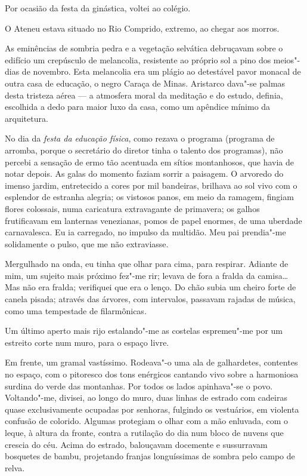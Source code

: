 Por ocasião da festa da ginástica, voltei ao colégio. 

O Ateneu estava situado no Rio Comprido, extremo, ao chegar aos morros.

As eminências de sombria pedra e a vegetação selvática debruçavam sobre
o edifício um crepúsculo de melancolia, resistente ao próprio sol a
pino dos meios"-dias de novembro. Esta melancolia era um plágio ao
detestável pavor monacal de outra casa de educação, o negro Caraça de
Minas. Aristarco dava"-se palmas desta tristeza aérea --- a atmosfera
moral da meditação e do estudo, definia, escolhida a dedo para maior
luxo da casa, como um apêndice mínimo da arquitetura. 

No dia da \textit{festa da educação física}, como rezava o programa (programa de arromba, 
porque o secretário do diretor tinha o talento dos programas), não percebi a
sensação de ermo tão acentuada em sítios montanhosos, que havia de
notar depois. As galas do momento faziam sorrir a paisagem. O arvoredo
do imenso jardim, entretecido a cores por mil bandeiras, brilhava ao
sol vivo com o esplendor de estranha alegria; os vistosos panos, em
meio da ramagem, fingiam flores colossais, numa caricatura extravagante
de primavera; os galhos frutificavam em lanternas venezianas, pomos de
papel enormes, de uma uberdade carnavalesca. Eu ia carregado, no
impulso da multidão. Meu pai prendia"-me solidamente o pulso, que me
não extraviasse. 

Mergulhado na onda, eu tinha que olhar para cima, para
respirar. Adiante de mim, um sujeito mais próximo fez"-me rir; levava
de fora a fralda da camisa\ldots{} Mas não era fralda; verifiquei que era o
lenço. Do chão subia um cheiro forte de canela pisada; através das
árvores, com intervalos, passavam rajadas de música, como uma
tempestade de filarmônicas. 

Um último aperto mais rijo estalando"-me as costelas espremeu"-me 
por um estreito corte num muro, para o espaço livre. 

Em frente, um gramal vastíssimo. Rodeava"-o uma ala de
galhardetes, contentes no espaço, com o pitoresco dos tons enérgicos
cantando vivo sobre a harmoniosa surdina do verde das montanhas. Por
todos os lados apinhava"-se o povo. Voltando"-me, divisei, ao longo
do muro, duas linhas de estrado com cadeiras quase exclusivamente
ocupadas por senhoras, fulgindo os vestuários, em violenta confusão de
colorido. Algumas protegiam o olhar com a mão enluvada, com o leque, à
altura da fronte, contra a rutilação do dia num bloco de nuvens que crescia do
céu. Acima do estrado, balouçavam docemente e sussurravam bosquetes de
bambu, projetando franjas longuíssimas de sombra pelo campo de relva.

